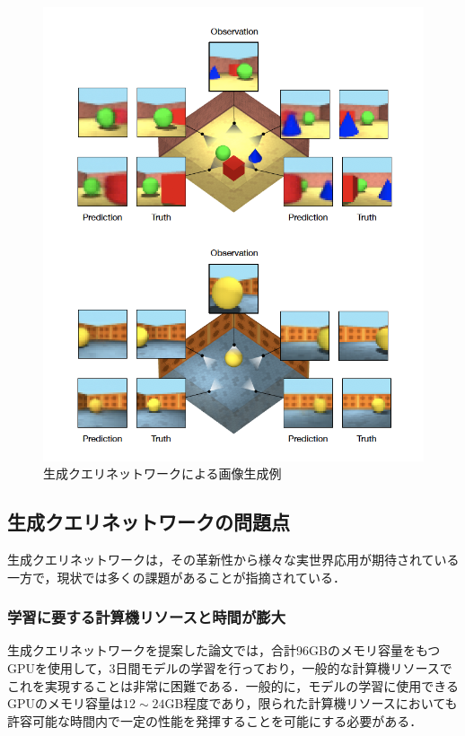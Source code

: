 \begin{figure}[tbp]
  \begin{center}
    \includegraphics[width=\linewidth]{./figures/gqn_example.png}
    \caption{生成クエリネットワークによる画像生成例}
    \label{fig:gqn_example}
  \end{center}
\end{figure}

\subsection{生成クエリネットワークの問題点}
生成クエリネットワークは，その革新性から様々な実世界応用が期待されている一方で，現状では多くの課題があることが指摘されている．

\subsubsection{学習に要する計算機リソースと時間が膨大}
生成クエリネットワークを提案した論文では，合計96GBのメモリ容量をもつGPUを使用して，3日間モデルの学習を行っており，一般的な計算機リソースでこれを実現することは非常に困難である．一般的に，モデルの学習に使用できるGPUのメモリ容量は$12 \sim 24$GB程度であり，限られた計算機リソースにおいても許容可能な時間内で一定の性能を発揮することを可能にする必要がある．

